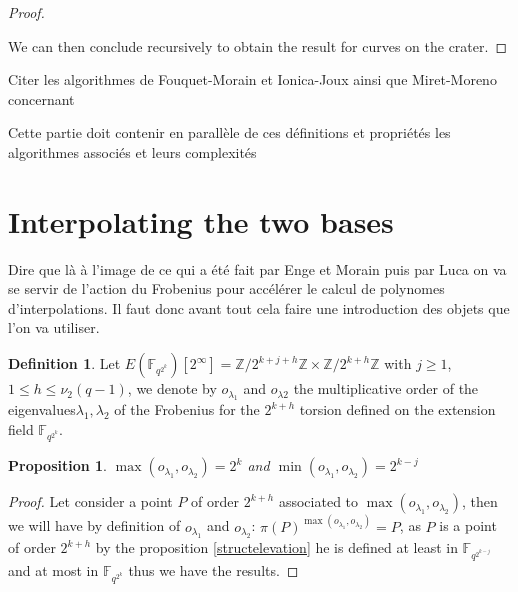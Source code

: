 \documentclass{article}
\theoremstyle{plain}
\newtheorem{prop}[thm]{Proposition}
\theoremstyle{definition}
\newtheorem{defi}[thm]{Definition}
\theoremstyle{remark}
\begin{document}
\begin{proof}
\begin{center}
\end{center}

 We can then conclude recursively to obtain the result for curves on the crater.
\end{proof}

Citer les algorithmes de Fouquet-Morain et Ionica-Joux ainsi que Miret-Moreno concernant 

Cette partie doit contenir en parallèle de ces définitions et propriétés les algorithmes associés et leurs complexités

\section{Interpolating the two bases}
Dire que là à l'image de ce qui a été fait par Enge et Morain puis par Luca on va se servir de l'action du Frobenius pour accélérer le calcul de polynomes d'interpolations. Il faut donc avant tout cela faire une introduction des objets que l'on va utiliser.

\begin{defi}
Let $E(\mathbb{F}_{q^{2^k}})[2^{\infty}]=\mathbb{Z}/2^{k+j+h} \mathbb{Z} \times \mathbb{Z}/2^{k+h} \mathbb{Z}$ with $j \geqslant 1$, $1 \leqslant h \leqslant \nu_2(q-1)$, we denote by $o_{\lambda_1}$ and $o_{\lambda2}$ the multiplicative order of the eigenvalues$\lambda_1 , \lambda_2$ of the Frobenius  for the $2^{k+h}$ torsion defined on the extension field $\mathbb{F}_{q^{2^k}}$.
\end{defi}

\begin{prop}
$\max(o_{\lambda_1},o_{\lambda_2}) = 2^k$ and $\min(o_{\lambda_1},o_{\lambda_2}) = 2^{k-j}$
\end{prop}

\begin{proof} %
Let consider a point $P$ of order $2^{k+h}$ associated to $\max(o_{\lambda_1},o_{\lambda_2})$, then we will have by definition of $o_{\lambda_1}$ and $o_{\lambda_2}$: $\pi(P)^{\max(o_{\lambda_1},o_{\lambda_2})}=P$, as $P$ is a point of order $2^{k+h}$ by the proposition \ref{structelevation} he is defined at least in $\mathbb{F}_{q^{2^{k-j}}}$ and at most in $\mathbb{F}_{q^{2^k}}$ thus we have the results.
\end{proof}





\end{document}
